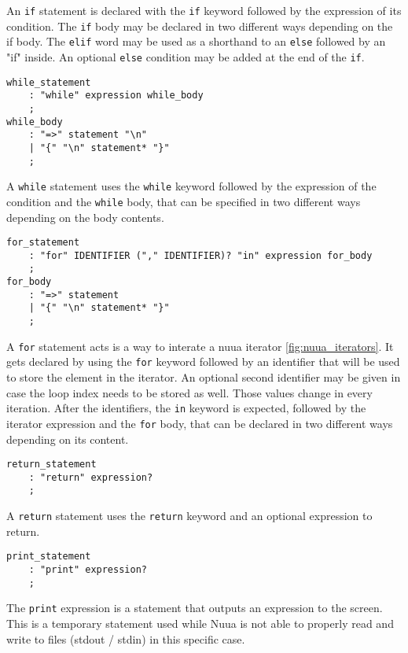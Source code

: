An \texttt{if} statement is declared with the \texttt{if} keyword followed by the expression of its condition.
The \texttt{if} body may be declared in two different ways depending on the if body. The \texttt{elif} word may be used as a shorthand
to an \texttt{else} followed by an "if" inside. An optional \texttt{else} condition may be added at the end of the \texttt{if}.

\begin{lstlisting}
while_statement
    : "while" expression while_body
    ;
while_body
    : "=>" statement "\n"
    | "{" "\n" statement* "}"
    ;
\end{lstlisting}

A \texttt{while} statement uses the \texttt{while} keyword followed by the expression of the condition and the \texttt{while} body, that can be specified
in two different ways depending on the body contents.

\begin{lstlisting}
for_statement
    : "for" IDENTIFIER ("," IDENTIFIER)? "in" expression for_body
    ;
for_body
    : "=>" statement
    | "{" "\n" statement* "}"
    ;
\end{lstlisting}

A \texttt{for} statement acts is a way to interate a nuua iterator \autoref{fig:nuua_iterators}.
It gets declared by using the \texttt{for} keyword followed by an identifier that will be used to store the element
in the iterator. An optional second identifier may be given in case the loop index needs to be stored as well.
Those values change in every iteration. After the identifiers, the \texttt{in} keyword is expected, followed by the iterator expression and the
\texttt{for} body, that can be declared in two different ways depending on its content.

\begin{lstlisting}
return_statement
    : "return" expression?
    ;
\end{lstlisting}

A \texttt{return} statement uses the \texttt{return} keyword and an optional expression to return.

\begin{lstlisting}
print_statement
    : "print" expression?
    ;
\end{lstlisting}

The \texttt{print} expression is a statement that outputs an expression to the screen. This is a temporary statement used while
Nuua is not able to properly read and write to files (stdout / stdin) in this specific case.

